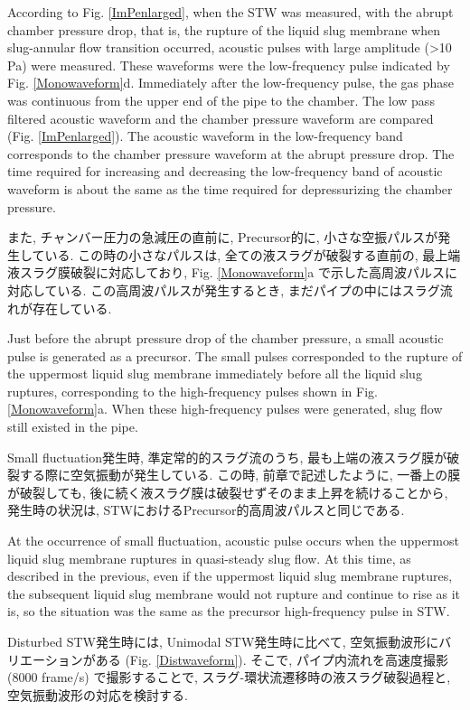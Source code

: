 \documentclass[12pt]{article}
\begin{document}
According to Fig. \ref{ImPenlarged}, when the STW was measured, with the abrupt chamber pressure drop, that is, the rupture of the liquid slug membrane when slug-annular flow transition occurred, acoustic pulses with large amplitude (>10 Pa) were measured.
These waveforms were the low-frequency pulse indicated by Fig. \ref{Monowaveform}d.
Immediately after the low-frequency pulse, the gas phase was continuous from the upper end of the pipe to the chamber.
The low pass filtered acoustic waveform and the chamber pressure waveform are compared (Fig. \ref{ImPenlarged}).
The acoustic waveform in the low-frequency band corresponds to the chamber pressure waveform at the abrupt pressure drop.
The time required for increasing and decreasing the low-frequency band of acoustic waveform is about the same as the time required for depressurizing the chamber pressure.

また, チャンバー圧力の急減圧の直前に, Precursor的に, 小さな空振パルスが発生している. 
この時の小さなパルスは, 全ての液スラグが破裂する直前の, 最上端液スラグ膜破裂に対応しており, Fig. \ref{Monowaveform}a で示した高周波パルスに対応している. この高周波パルスが発生するとき, まだパイプの中にはスラグ流れが存在している. 

Just before the abrupt pressure drop of the chamber pressure, a small acoustic pulse is generated as a precursor.
The small pulses corresponded to the rupture of the uppermost liquid slug membrane immediately before all the liquid slug ruptures, corresponding to the high-frequency pulses shown in Fig. \ref{Monowaveform}a.
When these high-frequency pulses were generated, slug flow still existed in the pipe.

Small fluctuation発生時, 準定常的的スラグ流のうち, 最も上端の液スラグ膜が破裂する際に空気振動が発生している. この時, 前章で記述したように, 一番上の膜が破裂しても, 後に続く液スラグ膜は破裂せずそのまま上昇を続けることから, 発生時の状況は, STWにおけるPrecursor的高周波パルスと同じである.

At the occurrence of small fluctuation, acoustic pulse occurs when the uppermost liquid slug membrane ruptures in quasi-steady slug flow. 
At this time, as described in the previous, even if the uppermost liquid slug membrane ruptures, the subsequent liquid slug membrane would not rupture and continue to rise as it is, so the situation was the same as the precursor high-frequency pulse in STW.

Disturbed STW発生時には, Unimodal STW発生時に比べて, 空気振動波形にバリエーションがある (Fig. \ref{Distwaveform}). 
そこで, パイプ内流れを高速度撮影 (8000 frame/s) で撮影することで, スラグ-環状流遷移時の液スラグ破裂過程と, 空気振動波形の対応を検討する.
\end{document}
